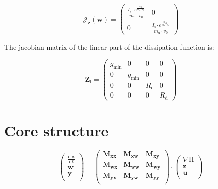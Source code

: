 \documentclass[11pt, oneside]{article}      %
\begin{document}
$$ \mathcal J_{\mathbf z}(\mathbf w) = \left(\begin{array}{cc}\frac{I_{\mathrm{s}} \cdot e^{\frac{w_{\mathrm{d1}}}{m_{\mathrm{u}} \cdot v_{\mathrm{0}}}}}{m_{\mathrm{u}} \cdot v_{\mathrm{0}}} & 0\\0 & \frac{I_{\mathrm{s}} \cdot e^{\frac{w_{\mathrm{d2}}}{m_{\mathrm{u}} \cdot v_{\mathrm{0}}}}}{m_{\mathrm{u}} \cdot v_{\mathrm{0}}}\end{array}\right)$$

%
%

The jacobian matrix of the linear part of the dissipation function is:


$$ \mathbf{Z_l} = \left(\begin{array}{cccc}g_{\mathrm{min}} & 0 & 0 & 0\\0 & g_{\mathrm{min}} & 0 & 0\\0 & 0 & R_{\mathrm{d}} & 0\\0 & 0 & 0 & R_{\mathrm{d}}\end{array}\right)$$

%
%

\section{Core structure}


$$
\left(
\begin{array}{c}
\frac{\mathrm d\, \mathbf x}{\mathrm d t} \\
\mathbf w \\
\mathbf y \\
\end{array}
\right)
=
\left(
\begin{array}{lll}
\mathbf{M_{xx}} & \mathbf{M_{xw}} & \mathbf{M_{xy}} \\
\mathbf{M_{wx}} & \mathbf{M_{ww}} & \mathbf{M_{wy}} \\
\mathbf{M_{yx}} & \mathbf{M_{yw}} &  \mathbf{M_{yy}} \\
\end{array}
\right)
\cdot
\left(
\begin{array}{c}
\nabla \mathrm H\\
\mathbf z \\
\mathbf u \\
\end{array}
\right)
$$

%
\end{document}
